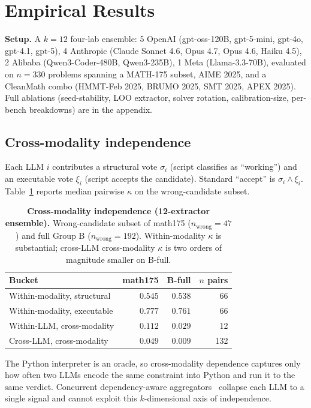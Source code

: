 \section{Empirical Results}
\label{sec:empirical}

\textbf{Setup.} A $k=12$ four-lab ensemble: 5 OpenAI (gpt-oss-120B,
gpt-5-mini, gpt-4o, gpt-4.1, gpt-5), 4 Anthropic (Claude Sonnet 4.6,
Opus 4.7, Opus 4.6, Haiku 4.5), 2 Alibaba (Qwen3-Coder-480B,
Qwen3-235B), 1 Meta (Llama-3.3-70B), evaluated on $n=330$ problems
spanning a MATH-175 subset, AIME 2025, and a CleanMath combo
(HMMT-Feb 2025, BRUMO 2025, SMT 2025, APEX 2025). Full ablations
(seed-stability, LOO extractor, solver rotation, calibration-size,
per-bench breakdowns) are in the appendix.

\subsection{Cross-modality independence}
\label{sec:cross_modality}

Each LLM $i$ contributes a structural vote $\sigma_i$ (script
classifies as ``working'') and an executable vote $\xi_i$ (script
accepts the candidate). Standard ``accept'' is
$\sigma_i \wedge \xi_i$. Table~\ref{tab:cross_modality} reports
median pairwise $\kappa$ on the wrong-candidate subset.

\begin{table}[h]
\centering
\caption{\textbf{Cross-modality independence (12-extractor
ensemble).} Wrong-candidate subset of math175 ($n_{\text{wrong}} = 47$)
and full Group B ($n_{\text{wrong}} = 192$). Within-modality
$\kappa$ is substantial; cross-LLM cross-modality $\kappa$ is two
orders of magnitude smaller on B-full.}
\label{tab:cross_modality}
\small
\setlength{\tabcolsep}{4pt}
\begin{tabular}{lrrr}
\toprule
Bucket                         & math175 & B-full & $n$ pairs \\
\midrule
Within-modality, structural    & $0.545$ & $0.538$ &  66 \\
Within-modality, executable    & $0.777$ & $0.761$ &  66 \\
Within-LLM, cross-modality     & $0.112$ & $0.029$ &  12 \\
Cross-LLM, cross-modality      & $0.049$ & $\mathbf{0.009}$ & 132 \\
\bottomrule
\end{tabular}
\end{table}

The Python interpreter is an oracle, so cross-modality dependence
captures only how often two LLMs encode the same constraint into
Python and run it to the same verdict. Concurrent dependency-aware
aggregators~\citep{kuai2026independence,zhao2026care,balasubramanian2026ising}
collapse each LLM to a single signal and cannot exploit this
$k$-dimensional axis of independence.

